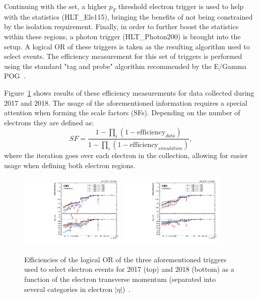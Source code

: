 \hspace{10pt} Continuing with the set, a higher $p_T$ threshold electron trigger is used to help with the statistics (HLT\_Ele115), bringing the benefits of not being constrained by the isolation requirement. Finally, in order to further boost the statistics within these regions, a photon trigger (HLT\_Photon200) is brought into the setup. A logical OR of these triggers is taken as the resulting algorithm used to select events. The efficiency measurement for this set of triggers is performed using the standard "tag and probe" algorithm recommended by the E/Gamma POG~\cite{twiki:EGamma_tag_and_probe}.

\hspace{10pt} Figure~\ref{fig:hlteff_electron} shows results of these efficiency measurements for data collected during 2017 and 2018. The usage of the aforementioned information requires a special attention when forming the scale factors (SFs). Depending on the number of electrons they are defined as:
\begin{equation}
    SF = \frac{1-\prod\limits_{i}(1-\text{efficiency}_{data})}{1-\prod\limits_{i}(1-\text{efficiency}_{simulation})},
\end{equation}
where the iteration goes over each electron in the collection, allowing for easier usage when defining both electron regions.

\begin{figure}[hbtp]
\begin{center}
    \includegraphics[width=0.45\textwidth]{Analysis_strategy/Electron_triggers/electron_trig_eff_2017.pdf}
    \includegraphics[width=0.45\textwidth]{Analysis_strategy/Electron_triggers/electron_trig_eff_2018.pdf}
    \caption{Efficiencies of the logical OR of the three aforementioned triggers used to select electron events for 2017 (top) and 2018 (bottom) as a function of the electron transverse momentum (separated into several categories in electron $|\eta|$)~\cite{note:AN_19_257}.}
    \label{fig:hlteff_electron}
 \end{center}
 \end{figure}


